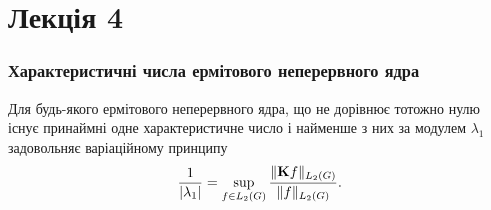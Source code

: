 \section*{Лекція 4}

\subsubsection*{Характеристичні числа ермітового неперервного ядра}

\begin{theorem}
	Для будь-якого ермітового неперервного ядра, що не дорівнює тотожно нулю існує принаймні одне характеристичне число і найменше з них за модулем $\lambda_1$ задовольняє варіаційному принципу
	\begin{equation}
		\label{eq:3.2}
		\dfrac{1}{|\lambda_1|} = \displaystyle\sup\limits_{f \in L_2(G)} \dfrac{\|\textbf{K} f\|_{L_2(G)}}{\|f\|_{L_2(G)}}.
	\end{equation}
\end{theorem}

